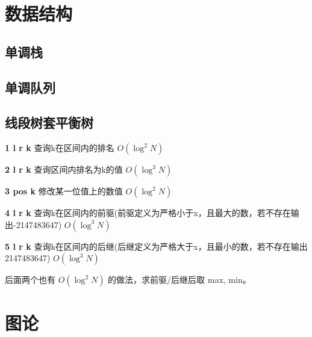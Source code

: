 \documentclass[twoside,a4paper]{article}
\begin{document}
\small

\newpage
\pagestyle{empty}
\renewcommand{\contentsname}{目录}
\tableofcontents
\newpage\clearpage
\newpage

\newpage
\mbox{}
\newpage


\pagestyle{fancy}
\setcounter{page}{1}   %


\section{数据结构}

\subsection{单调栈}


\subsection{单调队列}


\subsection{线段树套平衡树}
\textbf{1 l r k} 查询k在区间内的排名 $O(\log ^{2} N)$ \par
\textbf{2 l r k} 查询区间内排名为k的值 $O(\log ^{3} N)$ \par
\textbf{3 pos k} 修改某一位值上的数值 $O(\log ^{2} N)$\par
\textbf{4 l r k} 查询k在区间内的前驱(前驱定义为严格小于x，且最大的数，若不存在输出-2147483647) $O(\log ^{3} N)$ \par
\textbf{5 l r k} 查询k在区间内的后继(后继定义为严格大于x，且最小的数，若不存在输出2147483647) $O(\log ^{3} N)$ \par
后面两个也有 $O(\log ^{2} N)$ 的做法，求前驱/后继后取 max, min。 \par


\section{图论}
\end{document}

